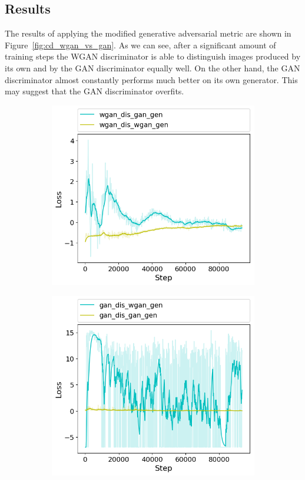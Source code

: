 \subsection{Results}
The results of applying the modified generative adversarial metric are shown in Figure~\ref{fig:cd_wgan_vs_gan}. As we can see, after a significant amount of training steps the WGAN discriminator is able to distinguish images produced by its own and by the GAN discriminator equally well. On the other hand, the GAN discriminator almost constantly performs much better on its own generator. This may suggest that the GAN discriminator overfits. 
\begin{figure}[h]
	\begin{subfigure}[b]{0.5\textwidth}
		\includegraphics[width=\textwidth]{figures/cross_dis/trial16_wgan_dis_gan_gen}
	\end{subfigure}
	\begin{subfigure}[b]{0.5\textwidth}
		\includegraphics[width=\textwidth]{figures/cross_dis/trial16_gan_dis_wgan_gen}

\end{subfigure}
\end{figure}
